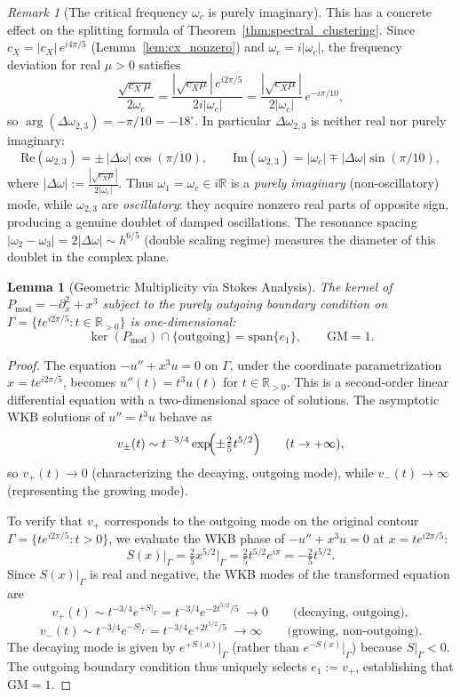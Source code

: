 \documentclass[12pt,a4paper]{amsart}
\newtheorem{lemma}[theorem]{Lemma}
\theoremstyle{remark}
\newtheorem{remark}[theorem]{Remark}
\begin{document}
\begin{remark}[The critical frequency $\omega_c$ is purely imaginary]
This has a concrete effect on the splitting formula of Theorem~\ref{thm:spectral_clustering}.
Since $c_X = |c_X|\,e^{i4\pi/5}$ (Lemma~\ref{lem:cx_nonzero}) and $\omega_c = i|\omega_c|$,
the frequency deviation for real $\mu > 0$ satisfies
\[
  \frac{\sqrt{c_X\,\mu}}{2\omega_c}
  = \frac{|\sqrt{c_X\mu}|\,e^{i2\pi/5}}{2i|\omega_c|}
  = \frac{|\sqrt{c_X\mu}|}{2|\omega_c|}\,e^{-i\pi/10},
\]
so $\arg(\Delta\omega_{2,3}) = -\pi/10 = {-18}^\circ$.
In particular $\Delta\omega_{2,3}$ is neither real nor purely imaginary:
\[
  \mathrm{Re}(\omega_{2,3}) = \pm\,|\Delta\omega|\cos(\pi/10),
  \qquad
  \mathrm{Im}(\omega_{2,3}) = |\omega_c| \mp |\Delta\omega|\sin(\pi/10),
\]
where $|\Delta\omega| := \tfrac{|\sqrt{c_X\mu}|}{2|\omega_c|}$.
Thus $\omega_1 = \omega_c \in i\mathbb{R}$ is a \emph{purely imaginary} (non-oscillatory) mode, while
$\omega_{2,3}$ are \emph{oscillatory}: they acquire nonzero real parts of opposite sign,
producing a genuine doublet of damped oscillations. The resonance spacing
$|\omega_2 - \omega_3| = 2|\Delta\omega| \sim h^{6/5}$ (double scaling regime) measures
the diameter of this doublet in the complex plane.
\end{remark}

\begin{lemma}[Geometric Multiplicity via Stokes Analysis]
\label{lem:stokes_gm1}
The kernel of $P_{\mathrm{mod}} = -\partial_x^2 + x^3$ subject to the purely outgoing
boundary condition on $\Gamma = \{te^{i2\pi/5} : t \in \mathbb{R}_{>0}\}$ is
one-dimensional:
\[
  \ker(P_{\mathrm{mod}}) \cap \{\text{outgoing}\} = \mathrm{span}\{e_1\},
  \qquad \mathrm{GM} = 1.
\]
\end{lemma}

\begin{proof}
The equation $-u'' + x^3 u = 0$ on $\Gamma$, under the coordinate parametrization $x = te^{i2\pi/5}$,
becomes $u''(t) = t^3 u(t)$ for $t \in \mathbb{R}_{>0}$.
This is a second-order linear differential equation with a two-dimensional space of solutions.
The asymptotic WKB solutions of $u'' = t^3 u$ behave as
\[
  v_\pm(t) \sim t^{-3/4}\exp\!\Bigl(\pm\tfrac{2}{5}t^{5/2}\Bigr)
  \qquad (t \to +\infty),
\]
so $v_+(t) \to 0$ (characterizing the decaying, outgoing mode), while $v_-(t) \to \infty$
(representing the growing mode).

To verify that $v_+$ corresponds to the outgoing mode on the original contour
$\Gamma = \{te^{i2\pi/5}: t > 0\}$, we evaluate the WKB phase of $-u'' + x^3 u = 0$
at $x = te^{i2\pi/5}$:
\[
  S(x)\big|_\Gamma
  = \tfrac{2}{5}x^{5/2}\big|_\Gamma
  = \tfrac{2}{5}t^{5/2}e^{i\pi}
  = -\tfrac{2}{5}t^{5/2}.
\]
Since $S(x)|_\Gamma$ is real and negative, the WKB modes of the transformed equation are
\[
  v_+(t) \sim t^{-3/4}e^{+S|_\Gamma} = t^{-3/4}e^{-2t^{5/2}/5} \;\to 0
  \qquad\text{(decaying, outgoing)},
\]
\[
  v_-(t) \sim t^{-3/4}e^{-S|_\Gamma} = t^{-3/4}e^{+2t^{5/2}/5} \;\to \infty
  \qquad\text{(growing, non-outgoing)}.
\]
The decaying mode is given by $e^{+S(x)}|_\Gamma$ (rather than $e^{-S(x)}|_\Gamma$) because
$S|_\Gamma < 0$.
The outgoing boundary condition thus uniquely selects $e_1 := v_+$, establishing that $\mathrm{GM} = 1$.
\end{proof}
\end{document}

